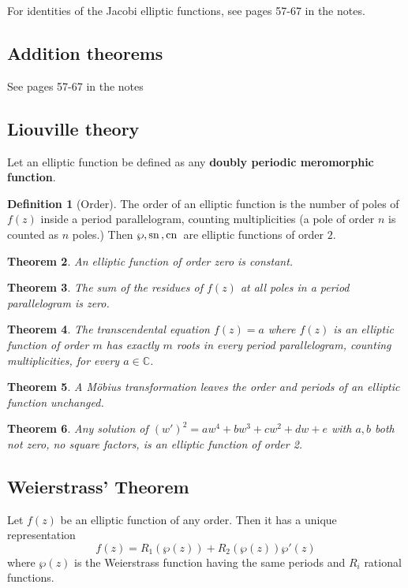 \documentclass[10pt, oneside, reqno]{amsart}
\theoremstyle{plain}%
\newtheorem{thm}{Theorem}[section]
\theoremstyle{definition}
\newtheorem{defn}[thm]{Definition}
\theoremstyle{remark}
\newcommand{\Com}{\mathbb{C}}
\begin{document}
For identities of the Jacobi elliptic functions, see pages 57-67 in the notes.

\subsection{Addition theorems} %
\label{sub:addition_theorems}
See pages 57-67 in the notes

\subsection{Liouville theory} %
\label{sub:liouville_theory}
Let an elliptic function be defined as any \textbf{doubly periodic meromorphic function}.  
\begin{defn}[Order]
	The order of an elliptic function is the number of poles of $f(z)$ inside a period parallelogram, counting multiplicities (a pole of order $n$ is counted as $n$ poles.)  Then $\wp, \text{sn}\,, \text{cn}\,$ are elliptic functions of order $2$.  
\end{defn}

\begin{thm}
	An elliptic function of order zero is constant.
\end{thm}

\begin{thm}
	The sum of the residues of $f(z)$ at all poles in a period parallelogram is zero.
\end{thm}

\begin{thm}
	The transcendental equation $f(z) = a$ where $f(z)$ is an elliptic function of order $m$ has exactly $m$ roots in every period parallelogram, counting multiplicities, for every $a \in \Com$.  
\end{thm}

\begin{thm}
	A M\"obius transformation leaves the order and periods of an elliptic function unchanged.  
\end{thm}
\begin{thm}
	Any solution of $(w')^2 = aw^4 + bw^3 + cw^2 +dw + e$ with $a,b$ both not zero, no square factors, is an elliptic function of order 2.
\end{thm}

\subsection{Weierstrass' Theorem} %
\label{sub:weierstrass_theorem}
	Let $f(z)$ be an elliptic function of any order.  Then it has a unique representation \[
		f(z) = R_1(\wp(z)) + R_2(\wp(z)) \wp'(z)
	\] where $\wp(z)$ is the Weierstrass function having the same periods and $R_i$ rational functions.  



\end{document}
